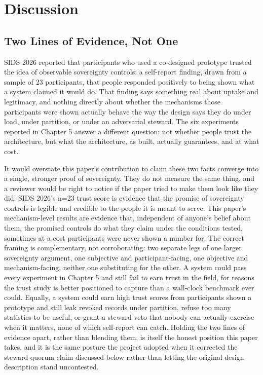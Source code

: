 \section{Discussion}

\subsection{Two Lines of Evidence, Not One}

SIDS 2026 \cite{katrakazas2026} reported that participants who used a co-designed prototype trusted the idea of observable sovereignty controls: a self-report finding, drawn from a sample of 23 participants, that people responded positively to being shown what a system claimed it would do. That finding says something real about uptake and legitimacy, and nothing directly about whether the mechanisms those participants were shown actually behave the way the design says they do under load, under partition, or under an adversarial steward. The six experiments reported in Chapter 5 answer a different question: not whether people trust the architecture, but what the architecture, as built, actually guarantees, and at what cost.

It would overstate this paper's contribution to claim these two facts converge into a single, stronger proof of sovereignty. They do not measure the same thing, and a reviewer would be right to notice if the paper tried to make them look like they did. SIDS 2026's n=23 trust score is evidence that the promise of sovereignty controls is legible and credible to the people it is meant to serve. This paper's mechanism-level results are evidence that, independent of anyone's belief about them, the promised controls do what they claim under the conditions tested, sometimes at a cost participants were never shown a number for. The correct framing is complementary, not corroborating: two separate legs of one larger sovereignty argument, one subjective and participant-facing, one objective and mechanism-facing, neither one substituting for the other. A system could pass every experiment in Chapter 5 and still fail to earn trust in the field, for reasons the trust study is better positioned to capture than a wall-clock benchmark ever could. Equally, a system could earn high trust scores from participants shown a prototype and still leak revoked records under partition, refuse too many statistics to be useful, or grant a steward veto that nobody can actually exercise when it matters, none of which self-report can catch. Holding the two lines of evidence apart, rather than blending them, is itself the honest position this paper takes, and it is the same posture the project adopted when it corrected the steward-quorum claim discussed below rather than letting the original design description stand uncontested.

